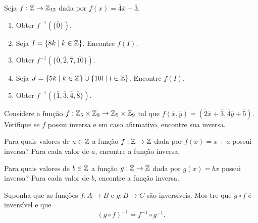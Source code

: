 \documentclass[12pt]{exam}
\begin{document}
    \vspace{.3cm}

    \questao{} Seja $f : \mathbb{Z} \to \mathbb{Z}_{12}$ dada por $f(x) = \overline{4}\overline{x} + \overline{3}$.
    \begin{enumerate}[label={\alph*})]
        \item Obter $f^{-1}(\{\overline{0}\})$.

        \item Seja $I = \{8k \mid k \in \mathbb{Z}\}$. Encontre $f(I)$.

        \item Obter $f^{-1}(\{\overline{0}, \overline{2}, \overline{7}, \overline{10}\})$.

        \item Seja $J = \{5k \mid k \in \mathbb{Z}\} \cup \{10l \mid l \in \mathbb{Z}\}$. Encontre $f(I)$.

        \item Obter $f^{-1}(\{\overline{1}, \overline{3}, \overline{4}, \overline{8}\})$.
    \end{enumerate}

    \vspace{.3cm}

    \questao{} Considere a fun{\c c}{\~a}o $f : \mathbb{Z}_5 \times \mathbb{Z}_9 \to \mathbb{Z}_5 \times \mathbb{Z}_9$ tal que $f(\overline{x},\overline{y}) = (\overline{2} \overline{x} + \overline{3}, \overline{4}\overline{y} + \overline{5})$. Verifique se $f$ possui inversa e em caso afirmativo, encontre sua inversa.

    \vspace{.3cm}

    \questao{} Para quais valores de $a \in \mathbb{Z}$ a função $f : \mathbb{Z} \to \mathbb{Z}$ dada por $f(x)       = x + a$ possui inversa? Para cada valor de $a$, encontre a função inversa.

    \vspace{.3cm}

    \questao{} Para quais valores de $b \in \mathbb{Z}$ a função $g : \mathbb{Z} \to \mathbb{Z}$ dada por $g(x)       = bx$ possui inversa? Para cada valor de $b$, encontre a função inversa.

    \vspace{.3cm}

    \questao{} Suponha que as funções $f : A \to B$ e $g : B \to C$ são inversíveis. Mos      tre que $g \circ f$ é inversível e que
    \[
        (g \circ f)^{-1} = f^{-1} \circ g^{-1}.
    \]

    \vspace{.3cm}
\end{document}
